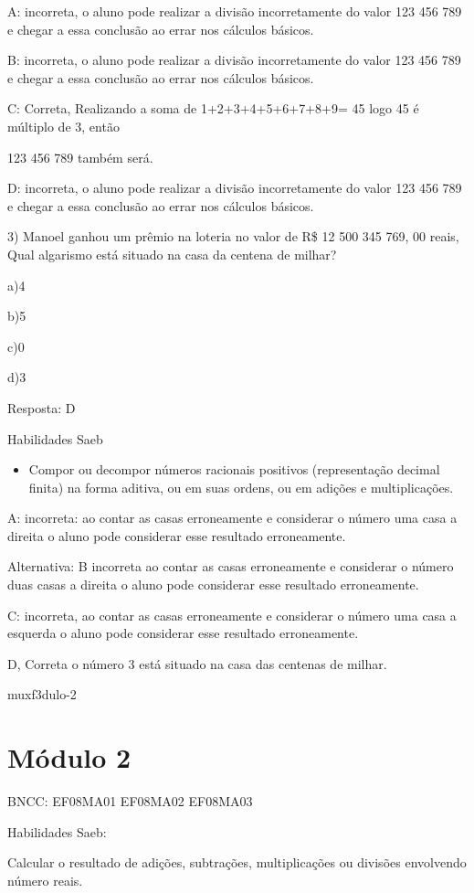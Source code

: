 {A: incorreta, o aluno pode realizar a divisão incorretamente do valor
123 456 789 e chegar a essa conclusão ao errar nos cálculos básicos.

B: incorreta, o aluno pode realizar a divisão incorretamente do valor
123 456 789 e chegar a essa conclusão ao errar nos cálculos básicos.

C: Correta, Realizando a soma de 1+2+3+4+5+6+7+8+9= 45 logo 45 é
múltiplo de 3, então

123 456 789 também será.

D: incorreta, o aluno pode realizar a divisão incorretamente do valor
123 456 789 e chegar a essa conclusão ao errar nos cálculos básicos.

3) Manoel ganhou um prêmio na loteria no valor de R\$ 12 500 345 769, 00
reais, Qual algarismo está situado na casa da centena de milhar?

a)4

b)5

c)0

d)3

Resposta: D

Habilidades Saeb

\begin{itemize}
\tightlist
\item
  Compor ou decompor números racionais positivos (representação decimal
  finita) na forma aditiva, ou em suas ordens, ou em adições e
  multiplicações.
\end{itemize}

A: incorreta: ao contar as casas erroneamente e considerar o número uma
casa a direita o aluno pode considerar esse resultado erroneamente.

Alternativa: B incorreta ao contar as casas erroneamente e considerar o
número duas casas a direita o aluno pode considerar esse resultado
erroneamente.

C: incorreta, ao contar as casas erroneamente e considerar o número uma
casa a esquerda o aluno pode considerar esse resultado erroneamente.

D, Correta o número 3 está situado na casa das centenas de milhar.

muxf3dulo-2}{%
\section{Módulo 2}

BNCC: EF08MA01 EF08MA02 EF08MA03

Habilidades Saeb:

Calcular o resultado de adições, subtrações, multiplicações ou divisões
envolvendo número reais.

}
